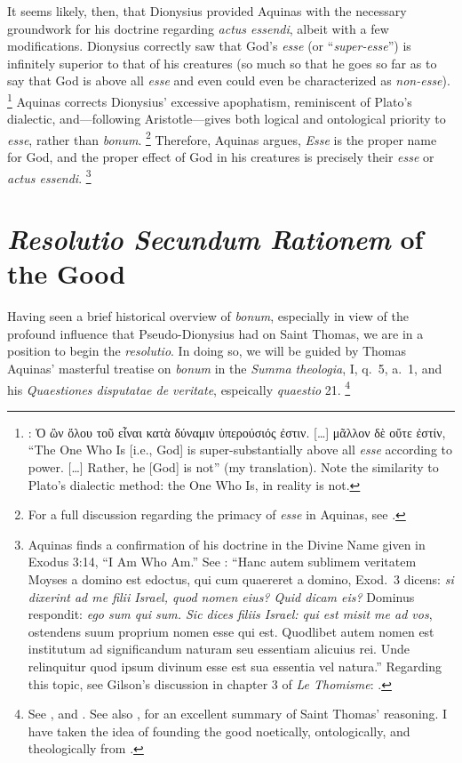 It seems likely, then, that Dionysius provided Aquinas with the necessary groundwork for his doctrine regarding \emph{actus essendi}, albeit with a few modifications.     Dionysius correctly saw that God’s \emph{esse} (or “\emph{super-esse}”) is infinitely superior to that of his creatures (so much so that he goes so far as to say that God is above all \emph{esse} and even could even be characterized as \emph{non-esse}).%
%
\footnote{\cite[V, 4]{pg:dionysius:DN}: Ὁ ὢν ὅλου τοῦ εἶναι κατὰ δύναμιν ὑπερ\-ούσιός ἐστιν. [\ldots] μᾶλλον δὲ οὔτε ἐστίν, “The One Who Is [i.e., God] is super-substantially above all \emph{esse} according to power. [\ldots] Rather, he [God] is not” (my translation). Note the similarity to Plato’s dialectic method: the One Who Is, in reality is not.}
%
Aquinas corrects Dionysius’ excessive apophatism, reminiscent of Plato’s dialectic, and—following Aristotle—gives both logical and ontological priority to \emph{esse}, rather than \emph{bonum}.%
%
\footnote{For a full discussion regarding the primacy of \emph{esse} in Aquinas, see \cite[109–113]{orourke:pseudo-dionysius}.} Therefore, Aquinas argues, \emph{Esse} is the proper name for God, and the proper effect of God in his creatures is precisely their \emph{esse} or \emph{actus essendi}.%
%
\footnote{Aquinas finds a confirmation of his doctrine in the Divine Name given in Exodus 3:14, “I Am Who Am.” See \cite[I, cap.~22, n.~10 (Marietti n.~211)]{st:contragent}:
“Hanc autem sublimem veritatem Moyses a domino est edoctus, qui cum quaereret a domino, Exod.~3 dicens: \emph{si dixerint ad me filii Israel, quod nomen eius? Quid dicam eis?} Dominus respondit: \emph{ego sum qui sum. Sic dices filiis Israel: qui est misit me ad vos}, ostendens suum proprium nomen esse qui est. Quodlibet autem nomen est institutum ad significandum naturam seu essentiam alicuius rei. Unde relinquitur quod ipsum divinum esse est sua essentia vel natura.”
Regarding this topic, see Gilson’s discussion in chapter 3 of \emph{Le Thomisme}: \cite[99-112]{gilson:thomisme}.}

\begin{DONE}

\end{DONE}

\section{\emph{Resolutio Secundum Rationem} of the Good}

Having seen a brief historical overview of \emph{bonum}, especially in view of the profound influence that Pseudo-Dionysius had on Saint Thomas, we are in a position to begin the \emph{resolutio}. In doing so, we will be guided by Thomas Aquinas’ masterful treatise on \emph{bonum} in the \emph{Summa theologia}, I, q.~5, a.~1, and his \emph{Quaestiones disputatae de veritate}, espeically \emph{quaestio} 21.%
%
\footnote{See \cite[I, q.~5, a.~1]{st:summa}, and \cite[q.~21]{st:deveritate}. See also \cite[63-69]{aertsen:good_as_transcendental}, for an excellent summary of Saint Thomas’ reasoning. I have taken the idea of founding the good noetically, ontologically, and theologically from \cite{mitchell:transcendentals}.}

